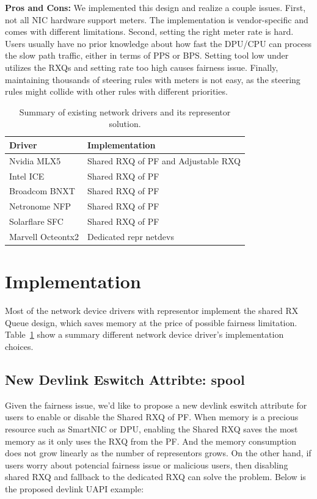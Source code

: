 \documentclass[letterpaper]{article}
\begin{document}
\textbf{Pros and Cons:} We implemented this design and realize a couple issues.
First, not all NIC hardware support meters. The implementation is vendor-specific
and comes with different limitations. Second, setting the right meter rate is hard.
Users usually have no prior knowledge
about how fast the DPU/CPU can process the slow path traffic, either in terms of
PPS or BPS. Setting tool low under utilizes the RXQs and setting rate too high
causes fairness issue.
Finally, maintaining thousands of steering rules with meters is not easy, as the
steering rules might collide with other rules with different priorities.

\begin{table}[h!]
\centering
\footnotesize
\begin{tabular}{|l|p{3.6cm}|} \hline
\textbf{Driver} &  \textbf{Implementation}\\ \hline \hline
Nvidia MLX5 & Shared RXQ of PF and \newline Adjustable RXQ \\ \hline
Intel ICE & Shared RXQ of PF~\cite{icepatch} \\ \hline
Broadcom BNXT & Shared RXQ of PF ~\cite{survey} \\ \hline
Netronome NFP & Shared RXQ of PF~\cite{survey} \\ \hline
Solarflare SFC & Shared RXQ of PF~\cite{survey} \\ \hline
Marvell Octeontx2 & Dedicated repr netdevs~\cite{octeontx2} \\ \hline
\end{tabular}
\caption{Summary of existing network drivers and its representor solution.}
\label{tab:vendors}
\end{table}

\section{Implementation}
Most of the network device drivers with representor implement the shared
RX Queue design, which saves memory at the price of possible
fairness limitation. Table~\ref{tab:vendors} show a summary different
network device driver's implementation choices.

\subsection{New Devlink Eswitch Attribte: spool}
Given the fairness issue, we'd like to propose a new devlink eswitch attribute
for users to enable or disable the Shared RXQ of PF.
When memory is a precious resource such as SmartNIC or DPU, enabling the Shared RXQ
saves the most memory as it only uses the RXQ from the PF. And the memory consumption
does not grow linearly as the number of representors grows.
On the other hand, if users worry about potencial fairness issue or malicious users,
then disabling shared RXQ and fallback to the dedicated RXQ can solve the problem.
Below is the proposed devlink UAPI example:
\end{document}
